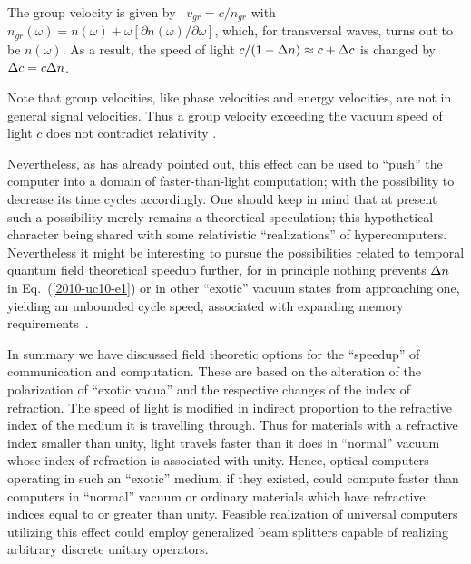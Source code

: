\documentclass[12pt]{article}
\begin{document}
The group velocity is given by~\cite[Equ.~(2)]{Scharnhorst-1998} $v_{gr}=c/n_{gr}$ with
$n_{gr}(\omega )= n (\omega )+ \omega \left[\partial n (\omega )/\partial \omega \right]$,
which, for transversal waves, turns out to be $n (\omega )$.
As a result, the speed of light $c/(1-{\rm \Delta }n)\approx c+{\rm \Delta }c$  is changed by  ${\rm \Delta }c = c {\rm \Delta }n$.

Note that
group velocities,
like phase velocities and energy velocities, are not in general signal velocities.
Thus a group velocity exceeding the vacuum speed of light $c$ does
not contradict relativity
\citep{PhysRevA.48.R34,Diener1996327,Chiao:02}.

Nevertheless, as has already pointed out, this effect can be used to ``push'' the computer into a domain of faster-than-light
computation; with the possibility to decrease its time cycles accordingly.
One should keep in mind that at present such a possibility merely remains a theoretical speculation;
this hypothetical character being shared with some relativistic ``realizations'' of hypercomputers.
Nevertheless it might be interesting to pursue the possibilities related to temporal quantum field theoretical speedup further,
for in principle nothing prevents ${\rm \Delta }n$ in Eq.~(\ref{2010-uc10-e1}) or in other ``exotic'' vacuum states from approaching one,
yielding an unbounded cycle speed, associated with expanding memory requirements~\citep{calude-staiger-09}.

In summary we have discussed field theoretic options for the ``speedup'' of communication and computation.
These are based on the alteration of the polarization of ``exotic vacua'' and the respective changes of the index of refraction.
The  speed of light is modified in indirect proportion to the refractive index of the medium it is travelling through.
Thus for materials with a refractive index smaller than unity,
light travels faster than it does in  ``normal''  vacuum whose index of refraction is associated with unity.
Hence, optical computers operating in such an ``exotic''  medium, if they existed, could compute faster
than computers in ``normal'' vacuum or ordinary materials which have refractive indices equal to or greater than unity.
Feasible realization of universal computers utilizing this effect
could employ generalized beam splitters capable of realizing arbitrary discrete unitary operators.
\end{document}
